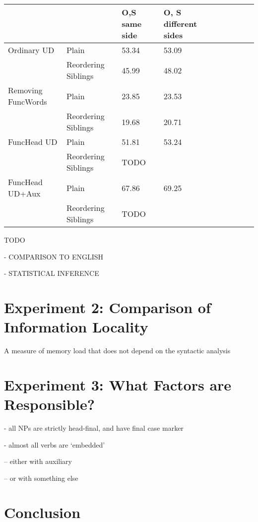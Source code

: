 \documentclass[11pt,a4paper]{article}
\begin{document}
\begin{center}
\begin{tabular}{lllllllll}
                    &                        & O,S same side   & O, S different sides    \\ \hline\hline
Ordinary UD         & Plain                  & 53.34 & 53.09\\
                    & Reordering Siblings    & 45.99 & 48.02 \\ \hline
Removing FuncWords  & Plain                  & 23.85 & 23.53 \\
                    & Reordering Siblings    & 19.68 & 20.71 \\ \hline
FuncHead UD         & Plain                  & 51.81 & 53.24 \\ %
                    & Reordering Siblings    &  TODO     &  \\ \hline
FuncHead UD+Aux         & Plain                  & 67.86 & 69.25 \\ %
                    & Reordering Siblings    &  TODO     & \\  \hline 
\end{tabular}
\end{center}

TODO

- COMPARISON TO ENGLISH

- STATISTICAL INFERENCE


\section{Experiment 2: Comparison of Information Locality}

A measure of memory load that does not depend on the syntactic analysis

\section{Experiment 3: What Factors are Responsible?}

- all NPs are strictly head-final, and have final case marker

- almost all verbs are `embedded'

-- either with auxiliary

-- or with something else





\section{Conclusion}
\end{document}
